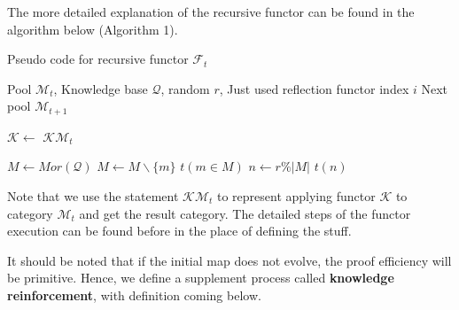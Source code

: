 \documentclass[preprint]{elsarticle}
\numberwithin{theorem}{section}	%
\numberwithin{axiom}{section}	%
\numberwithin{definition}{section}	%
\begin{document}
The more detailed explanation of the recursive functor can be found in the algorithm below (Algorithm 1).

\begin{algorithm}[h!]
	\caption{Pseudo code for recursive functor $\mathcal{F}_t$}
	\begin{algorithmic}[1]
		\Require Pool $\mathcal{M}_{t}$, Knowledge base $\mathcal{Q}$, random $\mathit{r}$, Just used reflection functor index $i$
		\Ensure Next pool $\mathcal{M}_{t+1}$
		
			\State $\mathcal{K} \gets $ 
			\State \Return $\mathcal{K} \mathcal{M}_t$
		\EndFunction
		
			\State $M \gets Mor(\mathcal{Q})$
					\State $M \gets M \backslash \{m\}$
				\EndIf
			\EndFor
				\State \Return $t(m \in M)$
			\Else
				\State $n \gets \mathit{r} \% |M|$
				\State \Return $t(n)$
			\EndIf
		\EndFunction
	\end{algorithmic}
\end{algorithm}

Note that we use the statement $\mathcal{K} \mathcal{M}_t$ to represent applying functor $\mathcal{K}$ to category $\mathcal{M}_t$ and get the result category. The detailed steps of the functor execution can be found before in the place of defining the stuff.

It should be noted that if the initial map does not evolve, the proof efficiency will be primitive. Hence, we define a supplement process called \textbf{ knowledge reinforcement}, with definition coming below.
\end{document}
